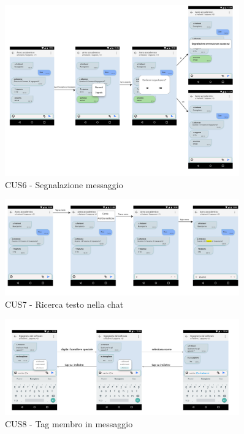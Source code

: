 \begin{figure}
	\centering
	\includegraphics[width=0.9\textwidth]{imgs/gruppo6/activities/act_cus6_segnalazione_messaggio.pdf}
	\caption{CUS6 - Segnalazione messaggio}
	\label{fig:act-cus6}
\end{figure}

\begin{figure}
	\centering
	\includegraphics[width=0.9\textwidth]{imgs/gruppo6/activities/act_cus7_ricerca_testo_nella_chat.pdf}
	\caption{CUS7 - Ricerca testo nella chat}
	\label{fig:act-cus7}
\end{figure}

\begin{figure}
	\centering
	\includegraphics[width=0.9\textwidth]{imgs/gruppo6/activities/act_cus8_tag_membro_messaggio.pdf}
	\caption{CUS8 - Tag membro in messaggio}
	\label{fig:act-cus8}
\end{figure}

